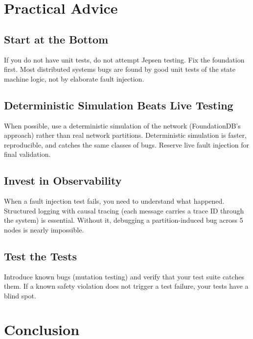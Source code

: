 \documentclass[11pt,a4paper]{article}
\begin{document}
\section{Practical Advice}

\subsection{Start at the Bottom}

If you do not have unit tests, do not attempt Jepsen testing. Fix the foundation first.
Most distributed systems bugs are found by good unit tests of the state machine logic,
not by elaborate fault injection.

\subsection{Deterministic Simulation Beats Live Testing}

When possible, use a deterministic simulation of the network (FoundationDB's approach)
rather than real network partitions. Deterministic simulation is faster, reproducible,
and catches the same classes of bugs. Reserve live fault injection for final validation.

\subsection{Invest in Observability}

When a fault injection test fails, you need to understand what happened. Structured
logging with causal tracing (each message carries a trace ID through the system) is
essential. Without it, debugging a partition-induced bug across 5 nodes is nearly
impossible.

\subsection{Test the Tests}

Introduce known bugs (mutation testing) and verify that your test suite catches them.
If a known safety violation does not trigger a test failure, your tests have a blind
spot.

\section{Conclusion}
\end{document}
